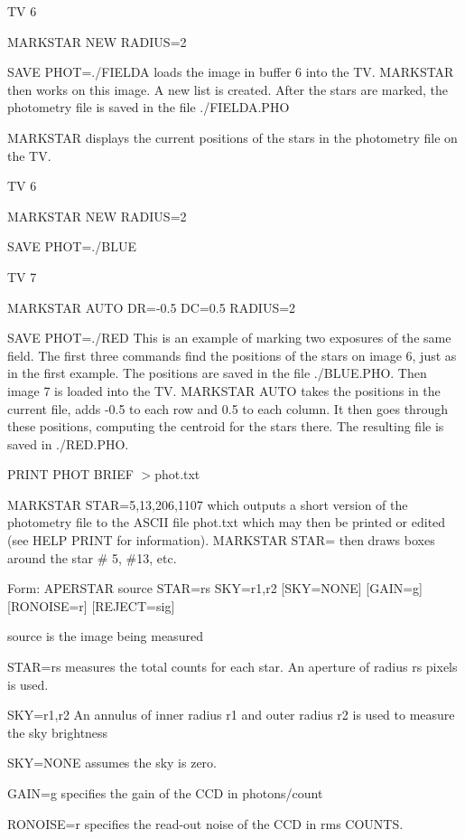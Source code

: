 {\newpage\clearpage
{}%
\begin{example}
  \item[TV 6\hfill]{}
  \item[MARKSTAR NEW RADIUS=2\hfill]{}
  \item[SAVE PHOT=./FIELDA\hfill]{
loads the image in buffer 6 into the TV.  MARKSTAR
then works on this image.  A new list is created.
After the stars are marked, the photometry file is
saved in the file ./FIELDA.PHO}
  \item[MARKSTAR\hfill]{
displays the current positions of the stars in the
photometry file on the TV.}
  \item[TV 6 \hfill]{}
  \item[MARKSTAR NEW RADIUS=2\hfill]{}
  \item[SAVE PHOT=./BLUE\hfill]{}
  \item[TV 7\hfill]{}
  \item[MARKSTAR AUTO DR=-0.5 DC=0.5 RADIUS=2\hfill]{}
  \item[SAVE PHOT=./RED\hfill]{ This is an example of marking two exposures
       of the same field.  The first three commands find the positions of
       the stars on image 6, just as in the first example.  The positions
       are saved in the file ./BLUE.PHO.  Then image 7 is loaded into the
       TV.  MARKSTAR AUTO takes the positions in the current file, adds
       -0.5 to each row and 0.5 to each column. It then goes through these
       positions, computing the centroid for the stars there.  The
       resulting file is saved in ./RED.PHO.}
\par\item[PRINT PHOT BRIEF $>$phot.txt\hfill]{}
\par\item[MARKSTAR STAR=5,13,206,1107\hfill]{ which outputs a short version
       of the photometry file to the ASCII file phot.txt which may then be
       printed or edited (see HELP PRINT for information).  MARKSTAR STAR=
       then draws boxes around the star \# 5, \#13, etc.}
\end{example}%
\lthtmlfigureZ
\lthtmlcheckvsize\clearpage}

{\newpage\clearpage
{}%
\begin{command}
  \item[Form: APERSTAR source STAR=rs SKY=r1,r2 {[SKY=NONE]} {[GAIN=g]} {[RONOISE=r]} {[REJECT=sig]}\hfill]{}
  \item[source]{is the image being measured}
  \item[STAR=rs]{measures the total counts for each star.
An aperture of radius rs pixels is used.}
  \item[SKY=r1,r2]{An annulus of inner radius r1 and outer
radius r2 is used to measure the sky brightness}
  \item[SKY=NONE]{assumes the sky is zero.}
  \item[GAIN=g]{specifies the gain of the CCD in photons/count}
  \item[RONOISE=r]{specifies the read-out noise of the CCD in rms COUNTS.}
\end{command}%
\lthtmlfigureZ
\lthtmlcheckvsize\clearpage}

